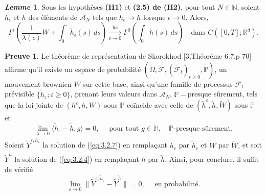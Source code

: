 \documentclass[12pt,a4paper,twoside]{report}%
\theoremstyle{definition}
\newtheorem*{pr}{\textbf{Preuve}}
\newtheorem{lem}[dfn]{\textit{Lemme}}
\numberwithin{equation}{section}
\begin{document}
\begin{lem}\label{lem:3.2.7}
	Sous les hypothèses \textbf{(H1)} et \textbf{(2.5) de (H2)}, pour tout $N \in \mathbb{N}$, soient $h_\epsilon$ et $h$ des éléments de $\mathscr{A}_N$ tels que $h_\epsilon \to h$ lorsque $\epsilon \to 0$. Alors,
	\[
	\Gamma^\epsilon\left( \frac{1}{\lambda(\epsilon)} W + \int_0^{\cdot} \dot{h}_\epsilon(s)\, ds \right)
	\xrightarrow[\epsilon \to 0]{\text{loi}}
	\Gamma^{0}\left( \int_0^{\cdot} \dot{h}(s)\, ds \right)
	\quad \text{dans } C([0,T];\mathbb{R}^d).
	\]
\end{lem} 
	 \begin{pr}
	 Le théorème de représentation de Skorokhod	[3,Théorème 6.7,p 70] affirme qu'il existe un espace de probabilité $(\widetilde{\Omega},\widetilde{\mathcal{F}},(\widetilde{\mathcal{F}_t})_{t\geq 0},\widetilde{\mathbb{P}})$, un mouvement brownien $W$ sur cette base, ainsi qu'une famille de processus $\mathcal{F}_t-$prévisible $\{\widetilde{h}_\varepsilon;\varepsilon\geq 0\}$, prenant leurs valeurs dans $\mathscr{A}_N$, $\mathbb{P}-$presque sûrement, tels que la loi jointe de $(h^\varepsilon,h,W)$ sous $\mathbb{P}$ coïncide avec celle de $(\widetilde{h}^\varepsilon,\widetilde{h},\widetilde{W})$ sous $\mathbb{P}$ et
	 \[
	 \lim_{\lambda\to 0}\langle \widetilde{h}_\epsilon - \widetilde{h}, g \rangle = 0, \quad \text{ pour tout } g \in \mathbb{H}, \quad \mathbb{P}\text{-presque sûrement}.
	 \]
	 Soient $\widetilde{Y}^{\varepsilon,\widetilde{h}_\varepsilon}$ la solution de (\ref{eq:3.2.7}) en remplaçant $h_\varepsilon$ par $\widetilde{h}_\varepsilon$ et $W$ par $\widetilde{W}$, et soit $\widetilde{Y}^{\widetilde{h}}$ la solution de (\ref{eq:3.2.4}) en remplaçant $h$ par $\widetilde{h}$. Ainsi, pour conclure, il suffit de vérifié
	 \[
	 \lim_{\varepsilon\to0}\|\widetilde{Y}^{\varepsilon,\widetilde{h}_\varepsilon}-\widetilde{Y}^{\widetilde{h}}\| = 0, \quad \text{ en probabilité}.
	 \]
	 

\end{pr}
\end{document}

